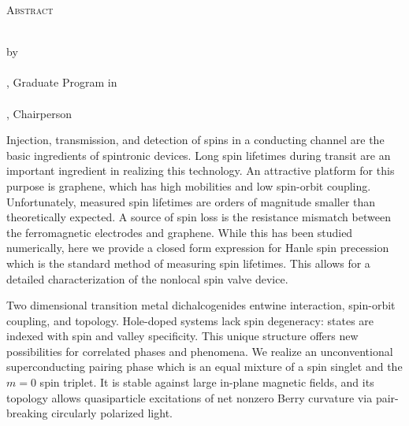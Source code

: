 \clearpage
\centering
\vspace*{-\toptafiddle}

\textsc{Abstract}

\thetitle{} \\
by \\
\theauthor{} \\

\thedegree, Graduate Program in \thefield{} \\
\theuniversity{} \\
\thechair{}, Chairperson \\
\thedate{}

\justify{}
Injection, transmission, and detection of spins in a conducting channel
are the basic ingredients of spintronic devices.
Long spin lifetimes during transit
are an important ingredient in realizing this technology.
An attractive platform for this purpose is graphene, which has high mobilities
and low spin-orbit coupling.
Unfortunately, measured spin lifetimes are orders of magnitude smaller
than theoretically expected.
A source of spin loss is the resistance mismatch between
the ferromagnetic electrodes and graphene.
While this has been studied numerically,
here we provide a closed form expression for Hanle spin precession
which is the standard method of measuring spin lifetimes.
This allows for a detailed characterization of the nonlocal spin valve device.

Two dimensional transition metal dichalcogenides entwine
interaction, spin-orbit coupling, and topology.
Hole-doped systems lack spin degeneracy:
states are indexed with spin and valley specificity.
This unique structure offers new possibilities
for correlated phases and phenomena.
We realize an unconventional superconducting pairing phase
which is an equal mixture of a spin singlet and the $m = 0$ spin triplet.
It is stable against large in-plane magnetic fields,
and its topology allows quasiparticle excitations
of net nonzero Berry curvature via pair-breaking circularly polarized light.

\enlargethispage{\bottafiddle}
\clearpage

